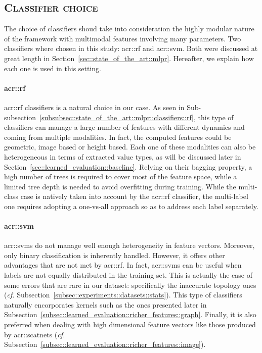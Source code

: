     \subsection{\textsc{Classifier choice}}
        \label{subsec::learned_evaluation::classification::classifiers}
        The choice of classifiers shoud take into consideration the highly modular nature of the framework with multimodal features involving many parameters.
        Two classifiers where chosen in this study: \gls{acr::rf} and \gls{acr::svm}.
        Both were discussed at great length in Section~\ref{sec::state_of_the_art::mlpr}.
        Hereafter, we explain how each one is used in this setting.\\

        \paragraph{\acrlong*{acr::rf}}
            \gls{acr::rf} classifiers is a natural choice in our case.
            As seen in Sub-subsection~\ref{subsubsec::state_of_the_art::mlpr::classifiers::rf}, this type of classifiers can manage a large number of features with different dynamics and coming from multiple modalities.
            In fact, the computed features could be geometric, image based or height based.
            Each one of these modalities can also be heterogeneous in terms of extracted value types, as will be discussed later in Section~\ref{sec::learned_evaluation::baseline}.
            Relying on their bagging property, a high number of trees is required to cover most of the feature space, while a limited tree depth is needed to avoid overfitting during training.
            While the multi-class case is natively taken into account by the \gls{acr::rf} classifier, the multi-label one requires adopting a one-vs-all approach so as to address each label separately.

        \paragraph{\acrshort*{acr::svm}}
            \glspl{acr::svm} do not manage well enough heterogeneity in feature vectors.
            Moreover, only binary classification is inherently handled.
            However, it offers other advantages that are not met by \gls{acr::rf}.
            In fact, \glspl{acr::svm} can be useful when labels are not equally distributed in the training set.
            This is actually the case of some errors that are rare in our dataset: specifically the inaccurate topology ones (\textit{cf.} Subsection~\ref{subsec::experiments::datasets::stats}).
            This type of classifiers naturally encorporates kernels such as the ones presented later in Subsection~\ref{subsec::learned_evaluation::richer_features::graph}.
            Finally, it is also preferred when dealing with high dimensional feature vectors like those produced by \glspl{acr::scatnet} (\textit{cf.} Subsection~\ref{subsec::learned_evaluation::richer_features::image}).

